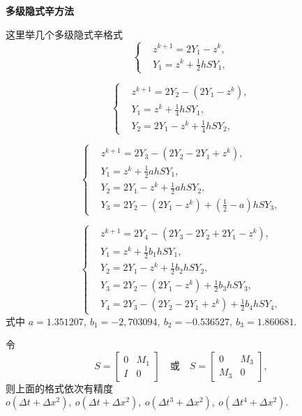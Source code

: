 \noindent \textbf{多级隐式辛方法}

这里举几个多级隐式辛格式 \cite{qin2011struc}
\begin{equation*}
	\left\lbrace \begin{aligned}
		&z^{k+1}=2Y_1-z^k,\\
		&Y_1=z^k+\frac{1}{2}hSY_1,
	\end{aligned}\right.
\end{equation*}

\begin{equation*}
	\left\lbrace \begin{aligned}
		&z^{k+1}=2Y_2-(2Y_1-z^k),\\
		&Y_1=z^k+\frac{1}{4}hSY_1,\\
		&Y_2=2Y_1-z^k+\frac{1}{4}hSY_2,
	\end{aligned}\right.
\end{equation*}

\begin{equation*}
	\left\lbrace \begin{aligned}
		&z^{k+1}=2Y_3-(2Y_2-2Y_1+z^k),\\
		&Y_1=z^k+\frac{1}{2}ahSY_1,\\
		&Y_2=2Y_1-z^k+\frac{1}{2}ahSY_2,\\
		&Y_3=2Y_2-(2Y_1-z^k)+(\frac{1}{2}-a)hSY_3,
	\end{aligned}\right.
\end{equation*}

\begin{equation*}
	\left\lbrace \begin{aligned}
		&z^{k+1}=2Y_4-(2Y_3-2Y_2+2Y_1-z^k),\\
		&Y_1=z^k+\frac{1}{2}b_1hSY_1,\\
		&Y_2=2Y_1-z^k+\frac{1}{2}b_2hSY_2,\\
		&Y_3=2Y_2-(2Y_1-z^k)+\frac{1}{2}b_3hSY_3,\\
		&Y_4=2Y_3-(2Y_2-2Y_1+z^k)+\frac{1}{2}b_4hSY_4,
	\end{aligned}\right.
\end{equation*}
式中 $a=1.351207,~ b_1=-2,703094,~ b_2=-0.536527,~ b_3=1.860681$.

令
\begin{equation*}
	S=\begin{bmatrix}
		0&M_1\\
		I&0
	\end{bmatrix}\quad \text{或} \quad S=\begin{bmatrix}
		0&M_3\\
		M_3&0
	\end{bmatrix},
\end{equation*}
则上面的格式依次有精度 $o(\Delta t+\Delta x^2),~o(\Delta t+\Delta x^2),~o(\Delta t^3+\Delta x^2),~o(\Delta t^4+\Delta x^2)$.

